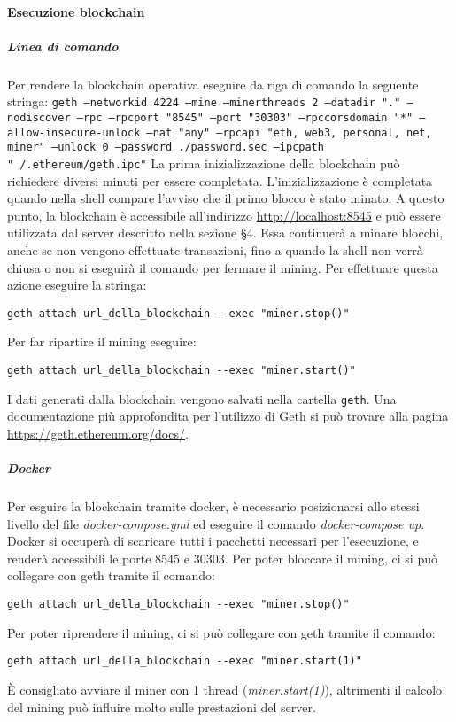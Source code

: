 \paragraph{Esecuzione blockchain}
\subparagraph{Linea di comando}
Per rendere la blockchain operativa eseguire da riga di comando la seguente stringa:\newline
\texttt{geth --networkid 4224 --mine --minerthreads 2 --datadir "." --nodiscover --rpc --rpcport "8545" --port "30303" --rpccorsdomain "*" --allow-insecure-unlock --nat "any" --rpcapi "eth, web3, personal, net, miner" --unlock 0 --password ./password.sec --ipcpath "~/.ethereum/geth.ipc"} \newline
La prima inizializzazione della blockchain può richiedere diversi minuti per essere completata. L'inizializzazione è completata quando nella shell compare l'avviso che il primo blocco è stato minato. A questo punto, la blockchain è accessibile all'indirizzo \url{http://localhost:8545} e può essere utilizzata dal server descritto nella sezione §4. Essa continuerà a minare blocchi, anche se non vengono effettuate transazioni, fino a quando la shell non verrà chiusa o non si eseguirà il comando per fermare il mining. Per effettuare questa azione eseguire la stringa: 
\begin{center}
	\texttt{geth attach url\_della\_blockchain -{}-exec "miner.stop()"}
\end{center} 
Per far ripartire il mining eseguire:
\begin{center}
	\texttt{geth attach url\_della\_blockchain -{}-exec "miner.start()"}
\end{center}
I dati generati dalla blockchain vengono salvati nella cartella \texttt{geth}. \newline
Una documentazione più approfondita per l'utilizzo di Geth si può trovare alla pagina \url{https://geth.ethereum.org/docs/}.

\subparagraph{Docker}
Per esguire la blockchain tramite docker, è necessario posizionarsi allo stessi livello del file \textit{docker-compose.yml} ed eseguire il comando \textit{docker-compose up}. Docker si occuperà di scaricare tutti i pacchetti necessari per l'esecuzione, e renderà accessibili le porte 8545 e 30303.\newline
Per poter bloccare il mining, ci si può collegare con geth tramite il comando:
\begin{center}
	\texttt{geth attach url\_della\_blockchain -{}-exec "miner.stop()"}
\end{center}
Per poter riprendere il mining, ci si può collegare con geth tramite il comando:
\begin{center}
	\texttt{geth attach url\_della\_blockchain -{}-exec "miner.start(1)"}
\end{center}
È consigliato avviare il miner con 1 thread (\textit{miner.start(1)}), altrimenti il calcolo del mining può influire molto sulle prestazioni del server.


